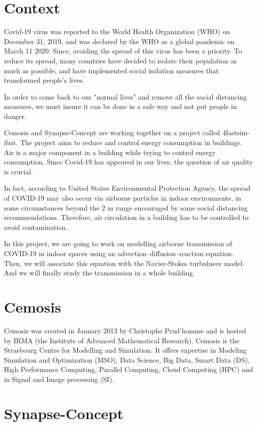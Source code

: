 \documentclass{article}
\begin{document}
\section*{Context}
Covid-19 virus was reported to the World Health Organization (WHO) on December 31, 2019, and was declared by the WHO as a global pandemic on March 11 2020. 
Since, avoiding the spread of this virus has been a priority. To reduce its spread, many countries have decided to isolate their population as much as possible, and have implemented social isolation measures that transformed people's lives.

In order to come back to our "normal lives" and remove all the social distancing measures, we must insure it can be done in a safe way and not put people in danger. 

Cemosis and Synapse-Concept are working together on a project called 4fastsim-ibat. The project aims to reduce and control energy consumption in buildings. Air is a major component in a building while trying to control energy consumption. Since Covid-19 has appeared in our lives, the question of air quality is crucial.

In fact, according to United States Environmental Protection Agency, the spread of COVID-19 may also occur via airborne particles in indoor environments, in some circumstances beyond the 2 m range encouraged by some social distancing recommendations.
Therefore, air circulation in a building has to be controlled to avoid contamination. 

In this project, we are going to work on modelling airborne transmission of COVID-19 in indoor spaces using an advection–diffusion–reaction equation. Then, we will associate this equation with the Navier-Stokes turbulnece model. And we will finally study the transmission in a whole building.

\section*{Cemosis}

Cemosis was created in January 2013 by Christophe Prud’homme and is hosted by IRMA (the Institute of Advanced Mathematical Research). Cemosis is the Strasbourg Centre for Modelling and Simulation. It offers expertise in Modeling Simulation and Optimization (MSO), Data Science, Big Data, Smart Data (DS), High Performance Computing, Parallel Computing, Cloud Computing (HPC) and in Signal and Image processing (SI). 


\section*{Synapse-Concept}
\end{document}
